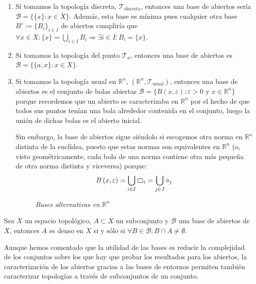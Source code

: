 \begin{ej}
\begin{enumerate}
    \item Si tomamos la topología discreta, $\mathcal{T}_{\text{discreta}}$, entonces una base de abiertos sería $\mathcal{B} = \{\{x\} : x \in X\}$. Además, esta base es mínima pues cualquier otra base $B' := \{B_i\}_{i\in I}$ de abiertos cumpliría que $\forall x \in X : \{x\} = \bigcup_{i \in  I} B_i \Rightarrow \exists i \in I : B_i = \{x\}$.
    \item Si tomamos la topología del punto $\mathcal{T}_a$, entonces una base de abiertos es $\mathcal{B} = \{\{a, x\} : x \in X\}$.
    \item Si tomamos la topología usual en $\mathbb{R}^n$, $\left( \mathbb{R}^n, \mathcal{T}_{\text{usual}} \right)$, entonces una base de abiertos es el conjunto de bolas abiertas $\mathcal{B} = \{B\left( x, \varepsilon \right) : \varepsilon > 0 \mbox{ y } x \in \mathbb{R}^n\}$ porque recordemos que un abierto se caracterizaba en $\mathbb{R}^n$ por el hecho de que todos sus puntos tenían una bola alrededor contenida en el conjunto, luego la unión de dichas bolas es el abierto inicial.

    Sin embargo, la base de abiertos sigue siéndolo si escogemos otra norma en $\mathbb{R}^n$ distinta de la euclídea, puesto que estas normas son equivalentes en $\mathbb{R}^n$ (o, visto geométricamente, cada bola de una norma contiene otra más pequeña de otra norma distinta y viceversa)
    porque:
    \[
    B\left( x, \varepsilon \right) = \bigcup_{i \in  I} \ooalign{$\sqsubset\mkern3mu$\cr$\mkern3mu\sqsupset$\cr}_i = \bigcup_{j \in J} \diamond_j
    \]
\begin{figure}[H]
    \centering
    \caption{\textit{Bases alternativas en $\mathbb{R}^n$}}
    \label{fig:bases-alternativas-en-rn}
\end{figure}
\end{enumerate}
\end{ej}

\begin{prop}
Sea $X$ un espacio topológico, $A \subset X$ un subconjunto y $\mathcal{B}$ una base de abiertos de $X$, entonces $A$ es denso en $X$ si y sólo si $\forall B \in \mathcal{B} : B \cap A \neq \emptyset$.
\end{prop}

Aunque hemos comentado que la utilidad de las bases es reducir la complejidad de los conjuntos sobre los que hay que probar los resultados para los abiertos, la caracterización de los abiertos gracias a las bases de entornos permiten también caracterizar topologías a través de subconjuntos de un conjunto.

